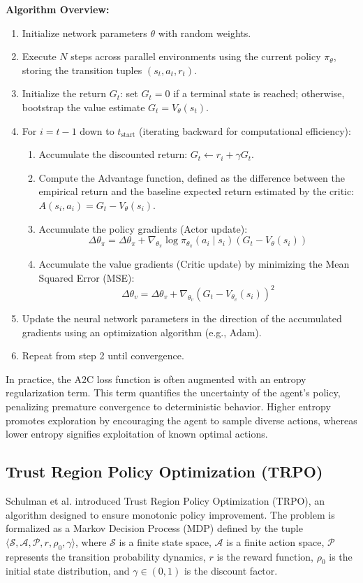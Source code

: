 \documentclass[a4paper]{scrartcl}
\begin{document}
\textbf{Algorithm Overview:}
\begin{enumerate}
    \item Initialize network parameters $\theta$ with random weights.
    \item Execute $N$ steps across parallel environments using the current policy $\pi_\theta$, storing the transition tuples $(s_t, a_t, r_t)$.
    \item Initialize the return $G_t$: set $G_t = 0$ if a terminal state is reached; otherwise, bootstrap the value estimate $G_t = V_\theta(s_t)$.
    \item For $i = t-1$ down to $t_{\text{start}}$ (iterating backward for computational efficiency):
    \begin{enumerate}
        \item Accumulate the discounted return: $G_t \leftarrow r_i + \gamma G_t$.
        \item Compute the Advantage function, defined as the difference between the empirical return and the baseline expected return estimated by the critic: $A(s_i, a_i) = G_t - V_\theta(s_i)$.
        \item Accumulate the policy gradients (Actor update):
        $$
        \Delta \theta_\pi = \Delta \theta_\pi + \nabla_{\theta_\pi} \log \pi_{\theta_\pi}(a_i \mid s_i) \left( G_t - V_\theta(s_i) \right)
        $$
        \item Accumulate the value gradients (Critic update) by minimizing the Mean Squared Error (MSE):
        $$
        \Delta \theta_v = \Delta \theta_v + \nabla_{\theta_v} \left( G_t - V_{\theta_v}(s_i) \right)^2
        $$
    \end{enumerate}
    \item Update the neural network parameters in the direction of the accumulated gradients using an optimization algorithm (e.g., Adam).
    \item Repeat from step 2 until convergence.
\end{enumerate}
In practice, the A2C loss function is often augmented with an entropy regularization term. This term quantifies the uncertainty of the agent's policy, penalizing premature convergence to deterministic behavior. Higher entropy promotes exploration by encouraging the agent to sample diverse actions, whereas lower entropy signifies exploitation of known optimal actions.

\subsection{Trust Region Policy Optimization (TRPO)}
Schulman et al. \cite{DBLP:conf/icml/SchulmanLAPM15} introduced Trust Region Policy Optimization (TRPO), an algorithm designed to ensure monotonic policy improvement. The problem is formalized as a Markov Decision Process (MDP) defined by the tuple $\langle \mathcal{S}, \mathcal{A}, \mathcal{P}, r, \rho_0, \gamma \rangle$, where $\mathcal{S}$ is a finite state space, $\mathcal{A}$ is a finite action space, $\mathcal{P}$ represents the transition probability dynamics, $r$ is the reward function, $\rho_0$ is the initial state distribution, and $\gamma \in (0,1)$ is the discount factor.
\end{document}
